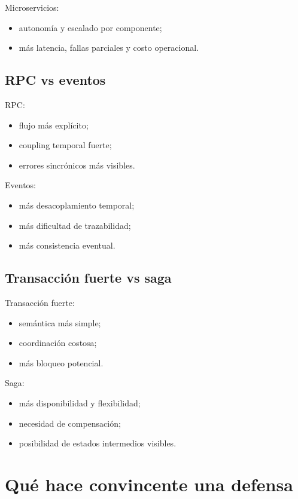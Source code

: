 \documentclass[variant=apuntes,cover=institutional,mode=screen]{ua-engineering-v6-article}
\begin{document}
Microservicios:
\begin{itemize}
\item autonomía y escalado por componente;
\item más latencia, fallas parciales y costo operacional.
\end{itemize}

\subsection{RPC vs eventos}

RPC:
\begin{itemize}
\item flujo más explícito;
\item coupling temporal fuerte;
\item errores sincrónicos más visibles.
\end{itemize}

Eventos:
\begin{itemize}
\item más desacoplamiento temporal;
\item más dificultad de trazabilidad;
\item más consistencia eventual.
\end{itemize}

\subsection{Transacción fuerte vs saga}

Transacción fuerte:
\begin{itemize}
\item semántica más simple;
\item coordinación costosa;
\item más bloqueo potencial.
\end{itemize}

Saga:
\begin{itemize}
\item más disponibilidad y flexibilidad;
\item necesidad de compensación;
\item posibilidad de estados intermedios visibles.
\end{itemize}

\section{Qué hace convincente una defensa}
\end{document}

